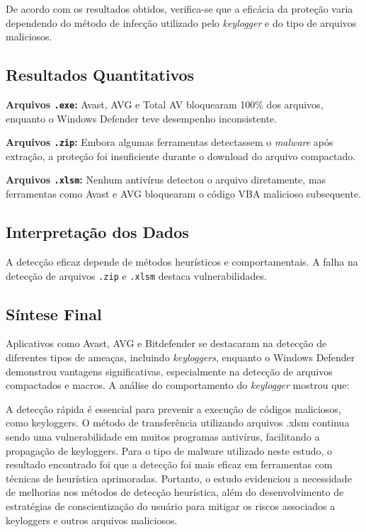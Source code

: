 \documentclass[12pt]{article}
\begin{document}
De acordo com os resultados obtidos, verifica-se que a eficácia da proteção varia dependendo do método de infecção utilizado pelo \textit{keylogger} e do tipo de arquivos maliciosos.

\subsection*{Resultados Quantitativos}
\textbf{Arquivos \texttt{.exe}:} Avast, AVG e Total AV bloquearam 100\% dos arquivos, enquanto o Windows Defender teve desempenho inconsistente.

\noindent\textbf{Arquivos \texttt{.zip}:} Embora algumas ferramentas detectassem o \textit{malware} após extração, a proteção foi insuficiente durante o download do arquivo compactado.

\noindent\textbf{Arquivos \texttt{.xlsm}:} Nenhum antivírus detectou o arquivo diretamente, mas ferramentas como Avast e AVG bloquearam o código VBA malicioso subsequente.

\subsection*{Interpretação dos Dados}
A detecção eficaz depende de métodos heurísticos e comportamentais. A falha na detecção de arquivos \texttt{.zip} e \texttt{.xlsm} destaca vulnerabilidades.

\subsection*{Síntese Final}
Aplicativos como Avast, AVG e Bitdefender se destacaram na detecção de diferentes tipos de ameaças, incluindo \textit{keyloggers}, enquanto o Windows Defender demonstrou vantagens significativas, especialmente na detecção de arquivos compactados e macros. A análise do comportamento do \textit{keylogger} mostrou que:

A detecção rápida é essencial para prevenir a execução de códigos maliciosos, como keyloggers. 
O método de transferência utilizando arquivos .xlsm continua sendo uma vulnerabilidade em muitos 
programas antivírus, facilitando a propagação de keyloggers. Para o tipo de malware utilizado neste 
estudo, o resultado encontrado foi que a detecção foi mais eficaz em ferramentas com técnicas de 
heurística aprimoradas. Portanto, o estudo evidenciou a necessidade de melhorias nos métodos de detecção 
heurística, além do desenvolvimento de estratégias de conscientização do usuário para mitigar os riscos associados a keyloggers e outros arquivos maliciosos.




\end{document}
